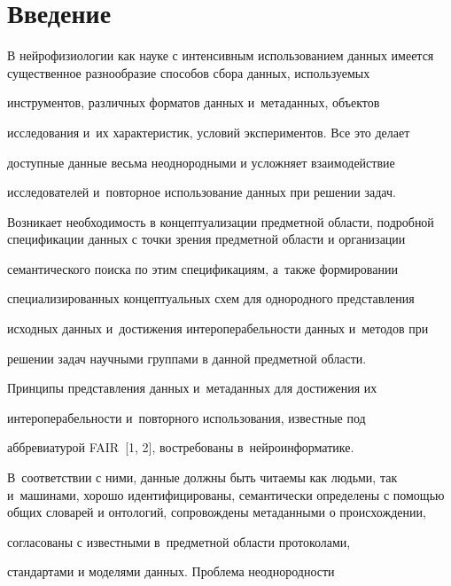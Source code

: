               

              \vspace*{-12pt} 





\section{Введение}



      В нейрофизиологии как науке с интенсивным использованием данных имеется существенное разнообразие способов сбора данных, используемых 

инструментов, различных форматов данных и~метаданных, объектов 

исследования и~их характеристик, условий экспериментов. Все это делает 

доступные данные весьма неоднородными и усложняет взаимодействие 

исследователей и~повторное использование данных при решении задач. 

Возникает необходимость в концептуализации предметной области, подробной спецификации данных с точки зрения предметной области и организации

 семантического поиска по этим спецификациям, а~также формировании 

специализированных концептуальных схем для однородного представления 

исходных данных и~достижения интероперабельности данных и~методов при 

решении задач научными группами в данной предметной области.

      

      

      Принципы представления данных и~метаданных для достижения их 

      интероперабельности и~повторного использования, известные под 

      аббревиатурой FAIR~[1, 2], востребованы в~нейроинформатике. 

      В~соответствии с ними, данные должны быть читаемы как людьми, так и~машинами, хорошо идентифицированы, семантически определены с помощью общих словарей и онтологий, сопровождены метаданными о происхождении,

       согласованы с известными в~предметной области протоколами, 

      стандартами и моделями данных. Проблема не\-од\-но\-род\-ности 

